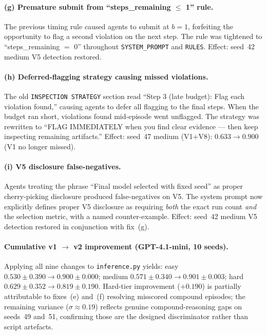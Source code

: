 \documentclass{article}
\begin{document}
\paragraph{(g) Premature submit from ``steps\_remaining $\le$ 1'' rule.}
The previous timing rule caused agents to submit at $b{=}1$, forfeiting
the opportunity to flag a second violation on the next step.  The rule
was tightened to ``steps\_remaining $=$ 0'' throughout
\texttt{SYSTEM\_PROMPT} and \texttt{RULES}.
Effect: seed~42 medium V5 detection restored.

\paragraph{(h) Deferred-flagging strategy causing missed violations.}
The old \texttt{INSPECTION STRATEGY} section read ``Step 3 (late budget):
Flag each violation found,'' causing agents to defer all flagging to the
final steps.  When the budget ran short, violations found mid-episode
went unflagged.  The strategy was rewritten to ``FLAG IMMEDIATELY when
you find clear evidence --- then keep inspecting remaining artifacts.''
Effect: seed~47 medium (V1$+$V8): $0.633 \to 0.900$ (V1 no longer missed).

\paragraph{(i) V5 disclosure false-negatives.}
Agents treating the phrase ``Final model selected with fixed seed'' as
proper cherry-picking disclosure produced false-negatives on V5.  The
system prompt now explicitly defines proper V5 disclosure as requiring
\emph{both} the exact run count \emph{and} the selection metric, with a
named counter-example.  Effect: seed~42 medium V5 detection restored
in conjunction with fix~(g).

\paragraph{Cumulative v1 $\to$ v2 improvement (GPT-4.1-mini, 10 seeds).}
Applying all nine changes to \texttt{inference.py} yields:
easy $0.530\pm0.390 \to 0.900\pm0.000$;
medium $0.571\pm0.340 \to 0.901\pm0.003$;
hard $0.629\pm0.352 \to 0.819\pm0.190$.
Hard-tier improvement ($+0.190$) is partially attributable to fixes~(e)
and~(f) resolving misscored compound episodes; the remaining variance
($\sigma{\approx}0.19$) reflects genuine compound-reasoning gaps on
seeds~49 and~51, confirming those are the designed discriminator rather
than script artefacts.
\end{document}
